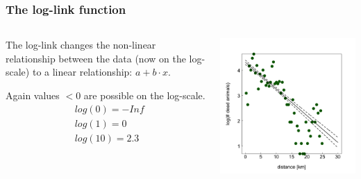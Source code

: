 \documentclass{beamer}
\begin{document}
\begin{frame}
    \frametitle{The log-link function}
    \begin{columns}
        \begin{column}{0.5\textwidth}
            The log-link changes the non-linear relationship between the data (now on the log-scale) to a linear relationship: $a + b \cdot x$.
            \vspace{0.2cm}
            
            Again values $< 0$ are possible on the log-scale.
            \begin{align*}
&log(0) = -Inf\\
&log(1) = 0 \\
&log(10) = 2.3
            \end{align*}
        \end{column}
        \begin{column}{0.5\textwidth}
            \includegraphics[width=\textwidth]{lectures/day_9_refreshing_glm/figures/unnamed-chunk-23-1.png}
        \end{column}
    \end{columns}
\end{frame}
\end{document}
